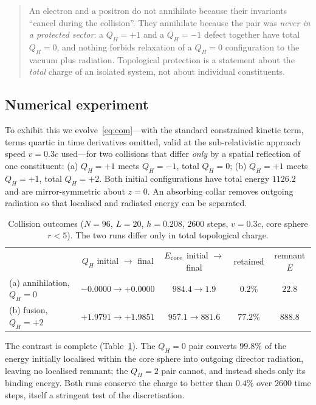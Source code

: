 \documentclass[aps,prd,preprint,nofootinbib,longbibliography]{revtex4-2}
\newcommand{\Qh}{Q_H}
\begin{document}
\begin{quote}
An electron and a positron do not annihilate because their invariants ``cancel
during the collision''. They annihilate because the pair was \emph{never in a
protected sector}: a $\Qh=+1$ and a $\Qh=-1$ defect together have total $\Qh=0$,
and nothing forbids relaxation of a $\Qh=0$ configuration to the vacuum plus
radiation. Topological protection is a statement about the \emph{total} charge of
an isolated system, not about individual constituents.
\end{quote}

\subsection{Numerical experiment}

To exhibit this we evolve~\eqref{eq:eom}---with the standard constrained kinetic
term, terms quartic in time derivatives omitted, valid at the sub-relativistic
approach speed $v=0.3c$ used---for two collisions that differ \emph{only} by a
spatial reflection of one constituent: (a) $\Qh=+1$ meets $\Qh=-1$, total
$\Qh=0$; (b) $\Qh=+1$ meets $\Qh=+1$, total $\Qh=+2$. Both initial
configurations have total energy $1126.2$ and are mirror-symmetric about $z=0$.
An absorbing collar removes outgoing radiation so that localised and radiated
energy can be separated.

\begin{table}[t]
\caption{Collision outcomes ($N=96$, $L=20$, $h=0.208$, $2600$ steps, $v=0.3c$,
core sphere $r<5$). The two runs differ only in total topological charge.}
\label{tab:dynamics}
\begin{ruledtabular}
\begin{tabular}{lcccc}
 & $\Qh$ initial $\to$ final & $E_{\rm core}$ initial $\to$ final & retained & remnant $E$ \\
\colrule
(a) annihilation, $\Qh=0$  & $-0.0000\to+0.0000$ & $984.4\to1.9$   & $0.2\%$  & $22.8$ \\
(b) fusion, $\Qh=+2$       & $+1.9791\to+1.9851$ & $957.1\to881.6$ & $77.2\%$ & $888.8$ \\
\end{tabular}
\end{ruledtabular}
\end{table}

The contrast is complete (Table~\ref{tab:dynamics}). The $\Qh=0$ pair converts
$99.8\%$ of the energy initially localised within the core sphere into outgoing
director radiation, leaving no localised remnant; the $\Qh=2$ pair cannot, and
instead sheds only its binding energy. Both runs conserve the charge to better
than $0.4\%$ over $2600$ time steps, itself a stringent test of the
discretisation.
\end{document}
